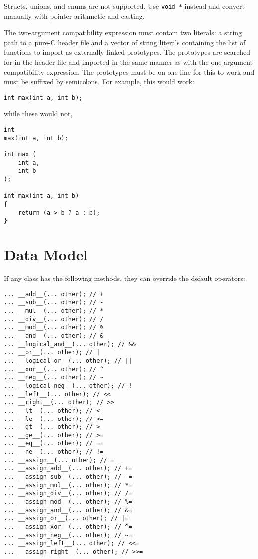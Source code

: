 \documentclass[10pt,a4paper]{article}
\begin{document}
Structs, unions, and enums are not supported. Use \verb|void *| instead and convert manually with pointer arithmetic and casting.

The two-argument compatibility expression must contain two literals: a string path to a pure-C header file and a vector of string literals containing the list of functions to import as externally-linked prototypes. The prototypes are searched for in the header file and imported in the same manner as with the one-argument compatibility expression. The prototypes must be on one line for this to work and must be suffixed by semicolons. For example, this would work:
\begin{verbatim}
int max(int a, int b);
\end{verbatim}

while these would not,
\begin{verbatim}
int
max(int a, int b);

int max (
    int a,
    int b
);

int max(int a, int b)
{
    return (a > b ? a : b);
}
\end{verbatim}

\section{Data Model}
\label{sec:dataModel}

If any class has the following methods, they can override the default operators:
\begin{verbatim}
... __add__(... other); // +
... __sub__(... other); // -
... __mul__(... other); // *
... __div__(... other); // /
... __mod__(... other); // %
... __and__(... other); // &
... __logical_and__(... other); // &&
... __or__(... other); // |
... __logical_or__(... other); // ||
... __xor__(... other); // ^
... __neg__(... other); // ~
... __logical_neg__(... other); // !
... __left__(... other); // <<
... __right__(... other); // >>
... __lt__(... other); // <
... __le__(... other); // <=
... __gt__(... other); // >
... __ge__(... other); // >=
... __eq__(... other); // ==
... __ne__(... other); // !=
... __assign__(... other); // =
... __assign_add__(... other); // +=
... __assign_sub__(... other); // -=
... __assign_mul__(... other); // *=
... __assign_div__(... other); // /=
... __assign_mod__(... other); // %=
... __assign_and__(... other); // &=
... __assign_or__(... other); // |=
... __assign_xor__(... other); // ^=
... __assign_neg__(... other); // ~=
... __assign_left__(... other); // <<=
... __assign_right__(... other); // >>=
\end{verbatim}
\end{document}
